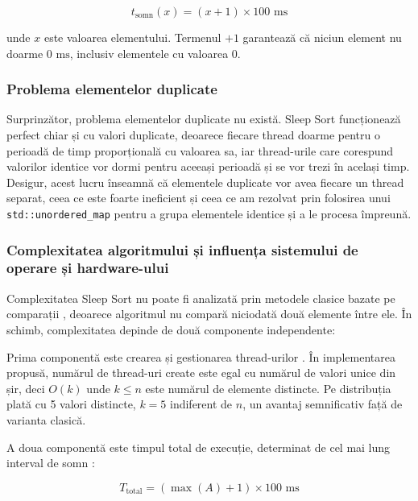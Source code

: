\documentclass[9pt,a4paper,twocolumn,twoside]{rho-class/rho}
\begin{document}
\begin{equation}
    t_{\text{somn}}(x) = (x + 1) \times 100 \text{ ms}
\end{equation}

unde $x$ este valoarea elementului. Termenul $+1$ garantează că 
niciun element nu doarme $0\text{ ms}$, inclusiv elementele cu 
valoarea $0$.

\subsubsection{Problema elementelor duplicate}

\par Surprinzător, problema elementelor duplicate nu există. Sleep Sort funcționează perfect chiar și cu valori duplicate, deoarece fiecare thread doarme pentru o perioadă de timp proporțională cu valoarea sa, iar thread-urile care corespund valorilor identice vor dormi pentru aceeași perioadă și se vor trezi în același timp.
Desigur, acest lucru înseamnă că elementele duplicate vor avea fiecare un thread separat, ceea ce este foarte ineficient și ceea ce am rezolvat prin folosirea unui \texttt{std::unordered\_map} pentru a grupa elementele identice și a le procesa împreună.

\subsubsection{Complexitatea algoritmului și influența sistemului 
de operare și hardware-ului}

Complexitatea Sleep Sort nu poate fi analizată prin metodele 
clasice bazate pe comparații \cite{devto_sleepsort}, deoarece 
algoritmul nu compară niciodată două elemente între ele. 
În schimb, complexitatea depinde de două componente independente:

\par Prima componentă este crearea și gestionarea thread-urilor 
\cite{cppreference_thread, tanenbaum2014modern}. În implementarea 
propusă, numărul de thread-uri create este egal cu numărul de 
valori unice din șir, deci $O(k)$ unde $k \leq n$ este numărul 
de elemente distincte. Pe distribuția plată cu 5 valori distincte, 
$k = 5$ indiferent de $n$, un avantaj semnificativ față de 
varianta clasică.

\par A doua componentă este timpul total de execuție, determinat 
de cel mai lung interval de somn \cite{microsoft_timers}:

\begin{equation}
    T_{\text{total}} = (\max(A) + 1) \times 100 \text{ ms}
\end{equation}
\end{document}
